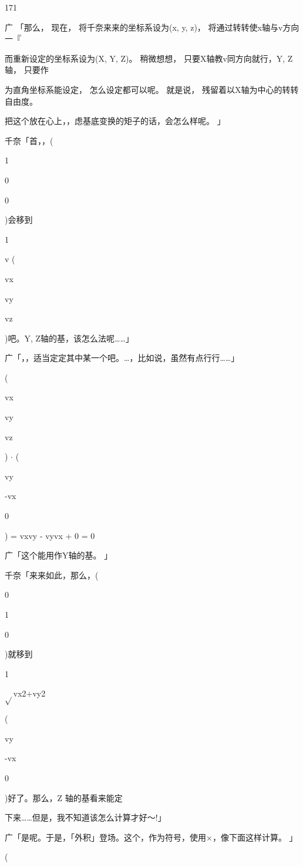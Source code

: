 171\par
广 「那么， 现在， 将千奈来来的坐标系设为(x, y, z)， 将通过转转使x轴与v方向一『\par
而重新设定的坐标系设为(X, Y, Z)。 稍微想想， 只要X轴教v同方向就行，Y, Z轴， 只要作\par
为直角坐标系能设定， 怎么设定都可以呢。 就是说， 残留着以X轴为中心的转转自由度。\par
把这个放在心上，，虑基底变换的矩子的话，会怎么样呢。 」\par
千奈「首，，(\par
1\par
0\par
0\par
)会移到\par
1\par
v (\par
vx\par
vy\par
vz\par
)吧。Y, Z轴的基，该怎么法呢……」\par
广「，，适当定定其中某一个吧。…，比如说，虽然有点行行……」\par
(\par
vx\par
vy\par
vz\par
) $\cdot$ (\par
vy\par
-vx\par
0\par
) = vxvy - vyvx + 0 = 0\par
广「这个能用作Y轴的基。 」\par
千奈「来来如此，那么，(\par
0\par
1\par
0\par
)就移到\par
1\par
$\sqrt{}$vx2+vy2\par
(\par
vy\par
-vx\par
0\par
)好了。那么，Z 轴的基看来能定\par
下来……但是，我不知道该怎么计算才好～!」\par
广「是呢。于是，「外积」登场。这个，作为符号，使用$\times$，像下面这样计算。 」\par
(\par
